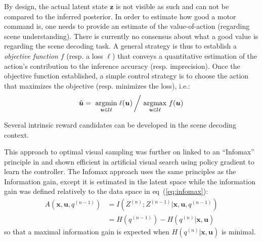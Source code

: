 \documentclass{article}
\begin{document}
By design, the actual latent state $\boldsymbol{z}$ is not visible as such and can not be compared to the inferred posterior. In order to estimate how good a motor command is, one needs to provide an estimate of the value-of-action (regarding scene understanding). There is currently no consensus about what a good value is regarding the scene decoding task. 
A general strategy is thus to establish a \emph{objective function} $f$ (resp. a loss $\ell$) that conveys a quantitative estimation of the action's contribution to the inference accuracy (resp. imprecision). Once the objective function established, a simple control strategy is to choose the action that maximizes the objective (resp. minimizes the loss), i.e.:
\begin{align}
\hat{\boldsymbol{u}} = \underset{\boldsymbol{u}\in\mathcal{U}}{\text{ argmin }}  \ell(\boldsymbol{u})\left/ \underset{\boldsymbol{u}\in\mathcal{U}}{\text{ argmax }}  f(\boldsymbol{u})\right.
\end{align}

 Several intrinsic reward candidates can be developed in the scene decoding context.



This approach to optimal visual sampling was further on linked to an ``Infomax'' principle in \cite{butko2010infomax} and shown efficient in artificial visual search using policy gradient \cite{williams1992simple} to learn the controller. The Infomax approach uses the same principles as the Information gain, except it is estimated in the latent space while the information gain was defined relatively to the data space in eq~(\ref{eq:infomax}):
\begin{align}
A(\boldsymbol{x}, \boldsymbol{u}, q^{(n-1)}) &= I(Z^{(n)}; Z^{(n-1)}|\boldsymbol{x}, \boldsymbol{u}, q^{(n-1)})\nonumber\\
&= H(q^{(n-1)}) - H(q^{(n)}|\boldsymbol{x}, \boldsymbol{u})
\end{align}
so that a maximal information gain is expected when $H(q^{(n)}|\boldsymbol{x}, \boldsymbol{u})$ is minimal.
\end{document}
